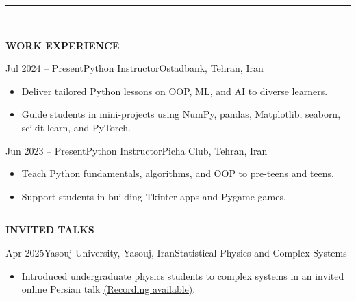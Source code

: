 \documentclass[12pt, b4paper]{cv}
\begin{document}
\vspace{-0.15in}
\rule{\textwidth}{1pt}\\
\vspace{-0.15in}

{\Large \textbf{WORK EXPERIENCE}}
\vspace{0.1in}

\begin{work}{Jul 2024 -- Present}{Python Instructor}{Ostadbank, Tehran, Iran}
\vspace{-0.05in}
\begin{itemize}
    \item Deliver tailored Python lessons on OOP, ML, and AI to diverse learners.
    \item Guide students in mini-projects using NumPy, pandas, Matplotlib, seaborn, scikit-learn, and PyTorch.
\end{itemize}
\end{work}

\vspace{-0.05in}

\begin{work}{Jun 2023 -- Present}{Python Instructor}{Picha Club, Tehran, Iran}
\vspace{-0.05in}
\begin{itemize}
    \item Teach Python fundamentals, algorithms, and OOP to pre-teens and teens.
    \item Support students in building Tkinter apps and Pygame games.
\end{itemize}
\end{work}




\vspace{-0.15in}
\rule{\textwidth}{1pt}
\vspace{-0.15in}



{\Large \textbf{INVITED TALKS}}
\vspace{0.1in}

\begin{school}{Apr 2025}{Yasouj University, Yasouj, Iran}{Statistical Physics and Complex Systems}
\vspace{-0.1in}
\begin{itemize}
    \item Introduced undergraduate physics students to complex systems in an invited online Persian talk
          \href{https://www.aparat.com/v/szyh283}{(Recording available)}.
\end{itemize}
\end{school}
\end{document}
